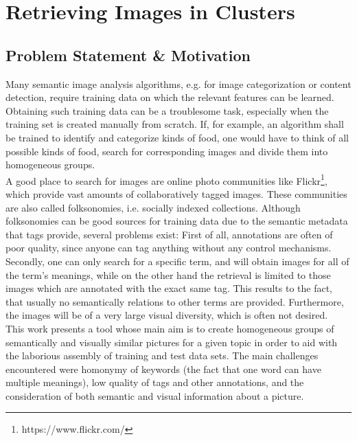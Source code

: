 \section{Retrieving Images in Clusters}
\label{sec_introduction}


\subsection{Problem Statement \& Motivation}
Many semantic image analysis algorithms, e.g. for image categorization or content detection, require training data on which the relevant features can be learned. Obtaining such training data can be a troublesome task, especially when the training set is created manually from scratch. If, for example, an algorithm shall be trained to identify and categorize kinds of food, one would have to think of all possible kinds of food, search for corresponding images and divide them into homogeneous groups. \\
A good place to search for images are online photo communities like Flickr\footnote{https://www.flickr.com/}, which provide vast amounts of collaboratively tagged images. These communities are also called folksonomies, i.e. socially indexed collections.
Although folksonomies can be good sources for training data due to the semantic metadata that tags provide, several problems exist: First of all, annotations are often of poor quality, since anyone can tag anything without any control mechanisms. Secondly, one can only search for a specific term, and will obtain images for all of the term's meanings, while on the other hand the retrieval is limited to those images which are annotated with the exact same tag. This results to the fact, that usually no semantically relations to other terms are provided. Furthermore, the images will be of a very large visual diversity, which is often not desired. \\

This work presents a tool whose main aim is to create homogeneous groups of semantically and visually similar pictures for a given topic in order to aid with the laborious assembly of training and test data sets. The main challenges encountered were homonymy of keywords (the fact that one word can have multiple meanings), low quality of tags and other annotations, and the consideration of both semantic and visual information about a picture.

